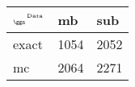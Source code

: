\begin{tabular}{lll}
    \toprule
    $_{\text{\tiny{\ggn}}}$$^{\text{\tiny{Data}}}$ & mb & sub \\
    \midrule
    exact & 1054
              & 2052 \\
    mc   & 2064
              & 2271 \\
    \bottomrule
\end{tabular}